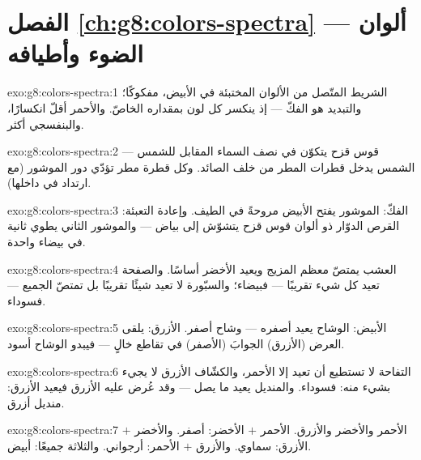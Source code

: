 \section*{الفصل \ref{ch:g8:colors-spectra} --- ألوان الضوء وأطيافه}

\begin{solution}{exo:g8:colors-spectra:1}
الشريط المتّصل من الألوان المختبئة في  الأبيض، مفكوكًا؛
والتبديد هو الفكّ --- إذ ينكسر كل لون بمقداره الخاصّ. والأحمر
أقلّ انكسارًا، والبنفسجي أكثر.
\end{solution}

\begin{solution}{exo:g8:colors-spectra:2}
قوس قزح يتكوّن في نصف السماء المقابل للشمس ---  الشمس يدخل
قطرات المطر من خلف الصائد. وكل قطرة مطر تؤدّي دور الموشور (مع
ارتداد  في داخلها).
\end{solution}

\begin{solution}{exo:g8:colors-spectra:3}
الفكّ: الموشور يفتح  الأبيض مروحةً في الطيف. وإعادة
التعبئة: القرص الدوّار ذو ألوان قوس قزح يتشوّش إلى بياض ---
والموشور الثاني يطوي  ثانية في  بيضاء واحدة.
\end{solution}

\begin{solution}{exo:g8:colors-spectra:4}
العشب يمتصّ معظم المزيج ويعيد الأخضر أساسًا. والصفحة تعيد كل
شيء تقريبًا --- فبيضاء؛ والسبّورة لا تعيد شيئًا تقريبًا بل
تمتصّ الجميع --- فسوداء.
\end{solution}

\begin{solution}{exo:g8:colors-spectra:5}
 الأبيض: الوشاح يعيد أصفره --- وشاح أصفر.  الأزرق:
يلقى العرض (الأزرق) الجوابَ (الأصفر) في تقاطع خالٍ --- فيبدو
الوشاح أسود.
\end{solution}

\begin{solution}{exo:g8:colors-spectra:6}
التفاحة لا تستطيع أن تعيد إلا الأحمر، والكشّاف الأزرق لا يجيء
بشيء منه: فسوداء. والمنديل يعيد ما يصل --- وقد عُرض عليه
الأزرق فيعيد الأزرق: منديل أزرق.
\end{solution}

\begin{solution}{exo:g8:colors-spectra:7}
الأحمر والأخضر والأزرق. الأحمر $+$ الأخضر: أصفر. والأخضر $+$
الأزرق: سماوي. والأزرق $+$ الأحمر: أرجواني. والثلاثة جميعًا:
أبيض.
\end{solution}


